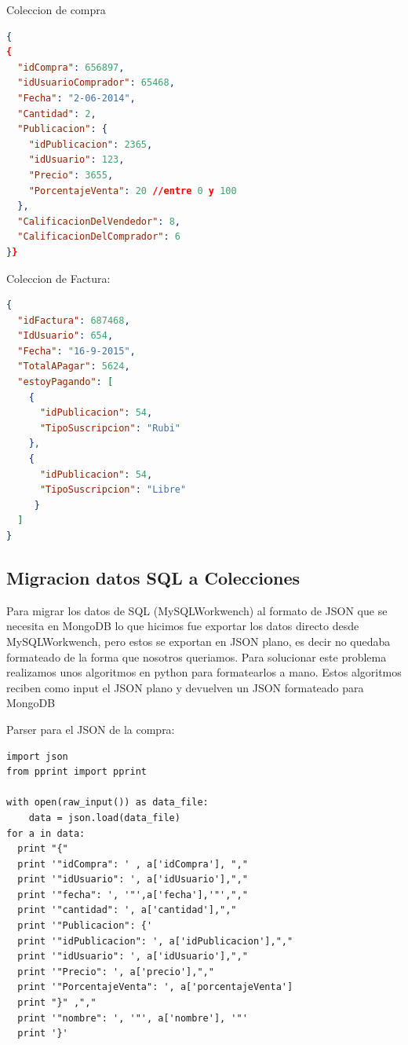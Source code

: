 \documentclass[a4paper, 10pt, twoside]{article}
\begin{document}
Coleccion de compra

\begin{lstlisting}[language=json,firstnumber=1]
{
{
  "idCompra": 656897,
  "idUsuarioComprador": 65468,
  "Fecha": "2-06-2014",
  "Cantidad": 2,
  "Publicacion": {
    "idPublicacion": 2365,
    "idUsuario": 123,
    "Precio": 3655,
    "PorcentajeVenta": 20 //entre 0 y 100
  },
  "CalificacionDelVendedor": 8,
  "CalificacionDelComprador": 6
}}
\end{lstlisting}


Coleccion de Factura:

\begin{lstlisting}[language=json,firstnumber=1]
{
  "idFactura": 687468,
  "IdUsuario": 654,
  "Fecha": "16-9-2015",
  "TotalAPagar": 5624,
  "estoyPagando": [
    {
      "idPublicacion": 54,
      "TipoSuscripcion": "Rubi"
    },
    {
      "idPublicacion": 54,
      "TipoSuscripcion": "Libre"
     }
  ]
}
\end{lstlisting}

\subsection{Migracion datos SQL a Colecciones}
Para migrar los datos de SQL (MySQLWorkwench) al formato de JSON que se necesita en MongoDB lo que hicimos fue exportar los datos directo desde MySQLWorkwench, pero estos se exportan en JSON plano, es decir no quedaba formateado de la forma que nosotros queriamos. 
Para solucionar este problema realizamos unos algoritmos en python para formatearlos a mano. Estos algoritmos reciben como input el JSON plano y devuelven un JSON formateado para MongoDB

Parser para el JSON de la compra:

\begin{verbatim}
import json
from pprint import pprint

with open(raw_input()) as data_file:    
    data = json.load(data_file)
for a in data:
  print "{"
  print '"idCompra": ' , a['idCompra'], ","
  print '"idUsuario": ', a['idUsuario'],","
  print '"fecha": ', '"',a['fecha'],'"',","
  print '"cantidad": ', a['cantidad'],","
  print '"Publicacion": {'
  print '"idPublicacion": ', a['idPublicacion'],","
  print '"idUsuario": ', a['idUsuario'],","
  print '"Precio": ', a['precio'],","
  print '"PorcentajeVenta": ', a['porcentajeVenta']
  print "}" ,","
  print '"nombre": ', '"', a['nombre'], '"'
  print '}'

\end{verbatim}
\end{document}
